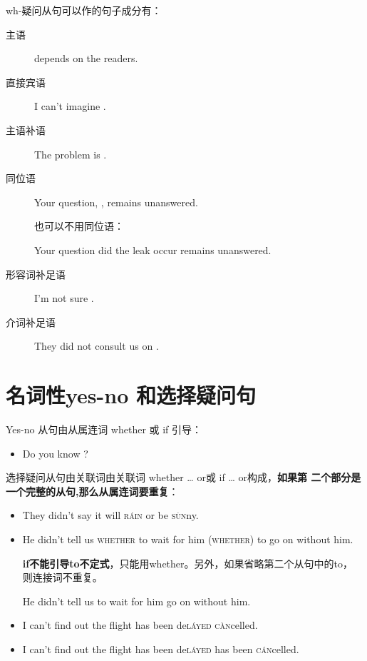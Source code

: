wh-疑问从句可以作的句子成分有：
\begin{description}
\item[主语]  depends on the readers.

\item[直接宾语] I can't imagine .

\item[主语补语] The problem is .

\item[同位语] Your question, , remains unanswered.

  也可以不用同位语：

  Your question  did the leak occur remains unanswered.

\item[形容词补足语] I'm not sure .

\item[介词补足语] They did not consult us on .
\end{description}

\section{名词性yes-no 和选择疑问句}

Yes-no 从句由从属连词 whether 或 if 引导：
\begin{itemize}
\item Do you know ?
\end{itemize}

选择疑问从句由关联词由关联词 whether \ldots{} or或 if \ldots{} or构成，\textbf{如果第
二个部分是一个完整的从句,那么从属连词要重复}：
\begin{itemize}
\item They didn't say  it will \textsc{r\'ain} or be \textsc{s\`un}ny.
\item He didn't tell us \textsc{whether} to wait for him 
  \textsc{(whether)} to go on without him.

  \textbf{if不能引导to不定式}，只能用whether。另外，如果省略第二个从句中的to，
  则连接词不重复。

  He didn't tell us  to wait for him  go on without him.

\item I can't find out  the flight has been de\textsc{l\'ayed}
   \textsc{c\`an}celled.

\item I can't find out  the flight has been de\textsc{l\'ayed} 
   has been \textsc{c\'an}celled.

\end{itemize}


